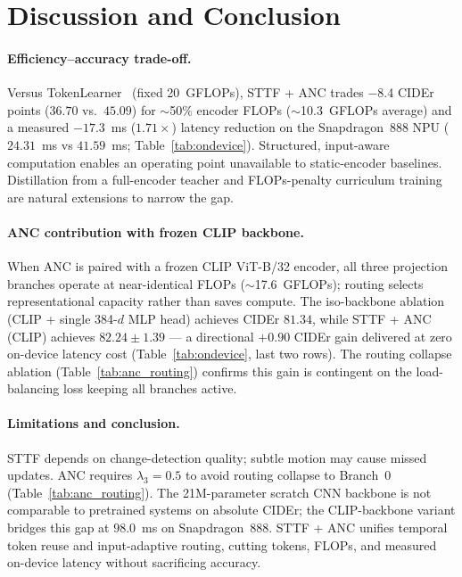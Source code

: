 \documentclass{article}
\begin{document}
\section{Discussion and Conclusion}

\paragraph{Efficiency--accuracy trade-off.}
Versus TokenLearner~\cite{ryoo2021tokenlearner} (fixed 20~GFLOPs), STTF + ANC trades $-$8.4 CIDEr points ($36.70$ vs.\ $45.09$) for $\sim$50\% encoder FLOPs ($\sim$10.3~GFLOPs average) and a measured $-17.3$~ms ($1.71\times$) latency reduction on the Snapdragon~888 NPU ($24.31$~ms vs $41.59$~ms; Table~\ref{tab:ondevice}). Structured, input-aware computation enables an operating point unavailable to static-encoder baselines. Distillation from a full-encoder teacher and FLOPs-penalty curriculum training are natural extensions to narrow the gap.

\paragraph{ANC contribution with frozen CLIP backbone.}
When ANC is paired with a frozen CLIP ViT-B/32 encoder, all three projection branches operate at near-identical FLOPs ($\sim$17.6~GFLOPs); routing selects representational capacity rather than saves compute. The iso-backbone ablation (CLIP + single 384-$d$ MLP head) achieves CIDEr $81.34$, while STTF + ANC (CLIP) achieves $82.24 \pm 1.39$ --- a directional $+0.90$ CIDEr gain delivered at zero on-device latency cost (Table~\ref{tab:ondevice}, last two rows). The routing collapse ablation (Table~\ref{tab:anc_routing}) confirms this gain is contingent on the load-balancing loss keeping all branches active.

\paragraph{Limitations and conclusion.}
STTF depends on change-detection quality; subtle motion may cause missed updates. ANC requires $\lambda_3{=}0.5$ to avoid routing collapse to Branch~0 (Table~\ref{tab:anc_routing}). The 21M-parameter scratch CNN backbone is not comparable to pretrained systems on absolute CIDEr; the CLIP-backbone variant bridges this gap at $98.0$~ms on Snapdragon~888. STTF + ANC unifies temporal token reuse and input-adaptive routing, cutting tokens, FLOPs, and measured on-device latency without sacrificing accuracy.
\end{document}
